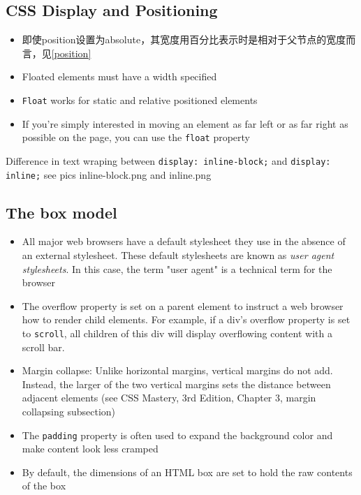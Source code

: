 \documentclass[a4paper, 12pt]{article}
\begin{document}
\subsection{CSS Display and Positioning}
\begin{itemize}
\item 即使position设置为absolute，其宽度用百分比表示时是相对于父节点的宽度而言，见\ref{position}

\item Floated elements must have a width specified

\item \verb|Float| works for static and relative positioned elements

\item  If you're simply interested in moving an element as far left or as far right as possible on the page, you can use the \verb|float| property

\end{itemize}

Difference in text wraping between \verb|display: inline-block;| and \verb|display: inline;| see pics inline-block.png and inline.png

\subsection{The box model}
\begin{itemize}

\item All major web browsers have a default stylesheet they use in the absence of an external stylesheet. These default stylesheets are known as \textit{user agent stylesheets}. In this case, the term "user agent" is a technical term for the browser

\item The overflow property is set on a parent element to instruct a web browser how to render child elements. For example, if a div's overflow property is set to \verb|scroll|, all children of this div will display overflowing content with a scroll bar.

\item Margin collapse: Unlike horizontal margins, vertical margins do not add. Instead, the larger of the two vertical margins sets the distance between adjacent elements (see CSS Mastery, 3rd Edition, Chapter 3, margin collapsing subsection)

\item The \verb|padding| property is often used to expand the background color and make content look less cramped

\item By default, the dimensions of an HTML box are set to hold the raw contents of the box

\end{itemize}
\end{document}
